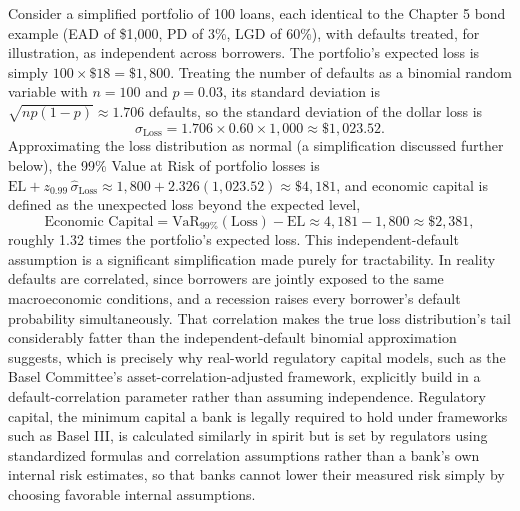 \documentclass[../ai_in_finance]{subfiles}
\begin{document}
Consider a simplified portfolio of 100 loans, each identical to the Chapter 5 bond example (EAD of \$1,000, PD of 3\%, LGD of 60\%), with defaults treated, for illustration, as independent across borrowers. The portfolio's expected loss is simply $100 \times \$18 = \$1{,}800$. Treating the number of defaults as a binomial random variable with $n=100$ and $p=0.03$, its standard deviation is $\sqrt{np(1-p)} \approx 1.706$ defaults, so the standard deviation of the dollar loss is
\begin{equation*}
\hat\sigma_{\text{Loss}} = 1.706 \times 0.60 \times 1{,}000 \approx \$1{,}023.52.
\end{equation*}
Approximating the loss distribution as normal (a simplification discussed further below), the 99\% Value at Risk of portfolio losses is $\text{EL} + z_{0.99}\,\hat\sigma_{\text{Loss}} \approx 1{,}800 + 2.326(1{,}023.52) \approx \$4{,}181$, and economic capital is defined as the unexpected loss beyond the expected level,
\begin{equation*}
\text{Economic Capital} = \text{VaR}_{99\%}(\text{Loss}) - \text{EL} \approx 4{,}181 - 1{,}800 \approx \$2{,}381,
\end{equation*}
roughly 1.32 times the portfolio's expected loss. This independent-default assumption is a significant simplification made purely for tractability. In reality defaults are correlated, since borrowers are jointly exposed to the same macroeconomic conditions, and a recession raises every borrower's default probability simultaneously. That correlation makes the true loss distribution's tail considerably fatter than the independent-default binomial approximation suggests, which is precisely why real-world regulatory capital models, such as the Basel Committee's asset-correlation-adjusted framework, explicitly build in a default-correlation parameter rather than assuming independence.
Regulatory capital, the minimum capital a bank is legally required to hold under frameworks such as Basel III, is calculated similarly in spirit but is set by regulators using standardized formulas and correlation assumptions rather than a bank's own internal risk estimates, so that banks cannot lower their measured risk simply by choosing favorable internal assumptions.
\end{document}
